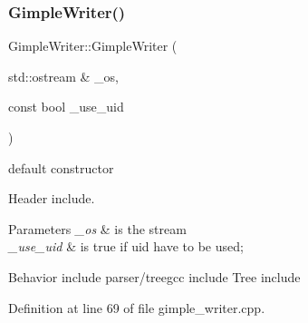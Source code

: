 \subsubsection{\texorpdfstring{Gimple\+Writer()}{GimpleWriter()}}
{\footnotesize\ttfamily Gimple\+Writer\+::\+Gimple\+Writer (\begin{DoxyParamCaption}\item[{std\+::ostream \&}]{\+\_\+os,  }\item[{const bool}]{\+\_\+use\+\_\+uid }\end{DoxyParamCaption})}



default constructor 

Header include.


\begin{DoxyParams}{Parameters}
{\em \+\_\+os} & is the stream \\
\hline
{\em \+\_\+use\+\_\+uid} & is true if uid have to be used;\\
\hline
\end{DoxyParams}
Behavior include parser/treegcc include Tree include 

Definition at line 69 of file gimple\+\_\+writer.\+cpp.



